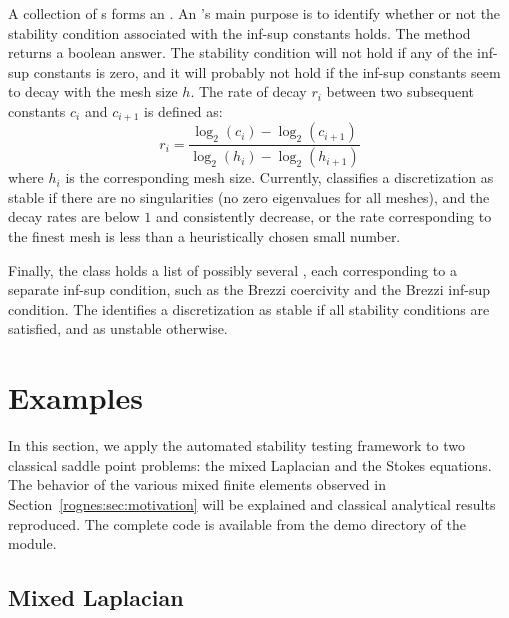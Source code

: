 A collection of s forms
an . An 's
main purpose is to identify whether or not the stability condition
associated with the inf-sup constants holds. The
method  returns a boolean answer. The
stability condition will not hold if any of the inf-sup constants is
zero, and it will probably not hold if the inf-sup constants seem to
decay with the mesh size $h$.  The rate of decay $r_i$ between two
subsequent constants $c_i$ and $c_{i+1}$ is defined as:
\begin{equation}
  r_i = \frac{\log_2(c_i) - \log_2(c_{i+1})}{\log_2(h_i) -
    \log_2(h_{i+1})}
\end{equation}
where $h_i$ is the corresponding mesh size. Currently, \rognesascot{}
classifies a discretization as stable if there are no singularities
(no zero eigenvalues for all meshes), and the decay rates are below
$1$ and consistently decrease, or the rate corresponding to the finest
mesh is less than a heuristically chosen small number.

Finally, the  class holds a list of
possibly several , each
corresponding to a separate inf-sup condition, such as the Brezzi
coercivity and the Brezzi inf-sup condition. The
 identifies a discretization as
stable if all stability conditions are satisfied, and as unstable
otherwise.

\section{Examples}
\label{rognes:sec:examples}

In this section, we apply the automated stability testing framework to
two classical saddle point problems: the mixed Laplacian and the
Stokes equations. The behavior of the various mixed finite elements
observed in Section~\ref{rognes:sec:motivation} will be explained and
classical analytical results reproduced. The complete code is
available from the demo directory of the \rognesascot{} module.

\subsection{Mixed Laplacian}

